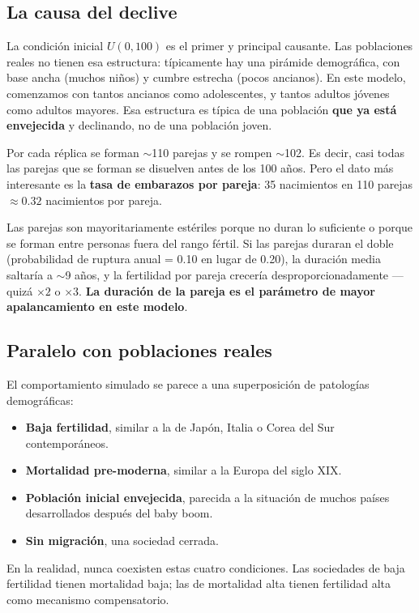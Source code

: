 \documentclass[12pt,a4paper]{article}
\begin{document}
\subsection{La causa del declive}

La condición inicial $U(0, 100)$ es el primer y principal causante. Las poblaciones reales no tienen esa estructura: típicamente hay una pirámide demográfica, con base ancha (muchos niños) y cumbre estrecha (pocos ancianos). En este modelo, comenzamos con tantos ancianos como adolescentes, y tantos adultos jóvenes como adultos mayores. Esa estructura es típica de una población \textbf{que ya está envejecida} y declinando, no de una población joven.

Por cada réplica se forman $\sim$110 parejas y se rompen $\sim$102. Es decir, casi todas las parejas que se forman se disuelven antes de los 100 años. Pero el dato más interesante es la \textbf{tasa de embarazos por pareja}: 35 nacimientos en 110 parejas $\approx 0.32$ nacimientos por pareja.

Las parejas son mayoritariamente estériles porque no duran lo suficiente o porque se forman entre personas fuera del rango fértil. Si las parejas duraran el doble (probabilidad de ruptura anual = 0.10 en lugar de 0.20), la duración media saltaría a $\sim$9 años, y la fertilidad por pareja crecería desproporcionadamente --- quizá $\times 2$ o $\times 3$. \textbf{La duración de la pareja es el parámetro de mayor apalancamiento en este modelo}.

\subsection{Paralelo con poblaciones reales}

El comportamiento simulado se parece a una superposición de patologías demográficas:

\begin{itemize}
    \item \textbf{Baja fertilidad}, similar a la de Japón, Italia o Corea del Sur contemporáneos.
    \item \textbf{Mortalidad pre-moderna}, similar a la Europa del siglo XIX.
    \item \textbf{Población inicial envejecida}, parecida a la situación de muchos países desarrollados después del baby boom.
    \item \textbf{Sin migración}, una sociedad cerrada.
\end{itemize}

En la realidad, nunca coexisten estas cuatro condiciones. Las sociedades de baja fertilidad tienen mortalidad baja; las de mortalidad alta tienen fertilidad alta como mecanismo compensatorio.
\end{document}
